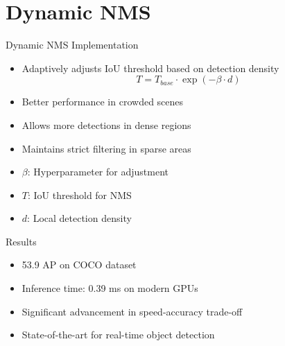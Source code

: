 \documentclass{beamer}
\begin{document}
\section{Dynamic NMS}
\begin{frame}{Dynamic NMS Implementation}
    \begin{itemize}
        \item Adaptively adjusts IoU threshold based on detection density
        \begin{equation}
        T = T_{base} \cdot \exp(-\beta \cdot d)
        \end{equation}
        \item Better performance in crowded scenes
        \item Allows more detections in dense regions
        \item Maintains strict filtering in sparse areas
        \item $\beta$: Hyperparameter for adjustment
        \item $T$: IoU threshold for NMS
        \item $d$: Local detection density
    \end{itemize}
\end{frame}

\begin{frame}{Results}
    \begin{itemize}
        \item 53.9 AP on COCO dataset
        \item Inference time: 0.39 ms on modern GPUs
        \item Significant advancement in speed-accuracy trade-off
        \item State-of-the-art for real-time object detection
    \end{itemize}
\end{frame}
\end{document}
